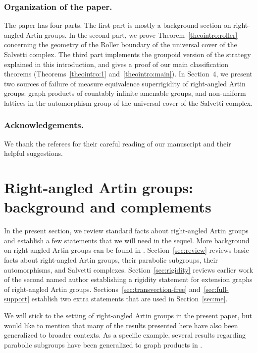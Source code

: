 \documentclass[11pt]{article}
\numberwithin{equation}{section}
\theoremstyle{plain}
\theoremstyle{definition}
\begin{document}
\subsubsection*{Organization of the paper.}

The paper has four parts. The first part is mostly a background section on right-angled Artin groups. In the second part, we prove Theorem~\ref{theointro:roller} concerning the geometry of the Roller boundary of the universal cover of the Salvetti complex. The third part implements the groupoid version of the strategy explained in this introduction, and gives a proof of our main classification theorems (Theorems~\ref{theointro:1} and~\ref{theointro:main}). In Section~4, we present two sources of failure of measure equivalence superrigidity of right-angled Artin groups: graph products of countably infinite amenable groups, and non-uniform lattices in the automorphism group of the universal cover of the Salvetti complex.

\subsubsection*{Acknowledgements.}
We thank the referees for their careful reading of our manuscript and their helpful suggestions.

\section{Right-angled Artin groups: background and complements}

In the present section, we review standard facts about right-angled Artin groups and establish a few statements that we will need in the sequel. More background on right-angled Artin groups can be found in \cite{charney2007introduction}. Section~\ref{sec:review} reviews basic facts about right-angled Artin groups, their parabolic subgroups, their automorphisms, and Salvetti complexes. Section~\ref{sec:rigidity} reviews earlier work of the second named author \cite{Hua} establishing a rigidity statement for extension graphs of right-angled Artin groups. Sections~\ref{sec:transvection-free} and~\ref{sec:full-support} establish two extra statements that are used in Section~\ref{sec:me}.

We will stick to the setting of right-angled Artin groups in the present paper, but would like to mention that many of the results presented here have also been generalized to broader contexts. As a specific example, several results regarding parabolic subgroups have been generalized to graph products in \cite[\S 3]{antolin2015tits}.
\end{document}
